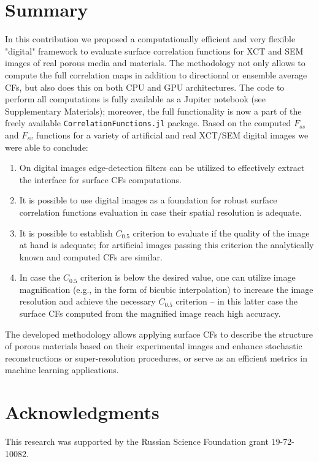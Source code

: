 \documentclass[reprint,amsmath,amssymb,aps,pre,showkeys,showpacs]{revtex4-1}
\newcommand{\code}[1]{\colorbox{light-gray}{\texttt{#1}}}
\begin{document}
\section{Summary}
\label{sec:summary}
In this contribution we proposed a computationally efficient and very flexible
"digital" framework to evaluate surface correlation functions for XCT and SEM
images of real porous media and materials. The methodology not only allows to
compute the full correlation maps in addition to directional or ensemble average
CFs, but also does this on both CPU and GPU architectures. The code to perform
all computations is fully available as a Jupiter notebook (see Supplementary
Materials); moreover, the full functionality is now a part of the freely
available \code{CorrelationFunctions.jl} package. Based on the computed $F_{ss}$
and $F_{sv}$ functions for a variety of artificial and real XCT/SEM digital
images we were able to conclude:
\begin{enumerate}
  \item On digital images edge-detection filters can be utilized to effectively
    extract the interface for surface CFs computations.
  \item It is possible to use digital images as a foundation for robust surface
    correlation functions evaluation in case their spatial resolution is
    adequate.
  \item It is possible to establish $C_{0.5}$ criterion to evaluate if the
    quality of the image at hand is adequate; for artificial images passing this
    criterion the analytically known and computed CFs are similar.
  \item In case the $C_{0.5}$ criterion is below the desired value, one can
    utilize image magnification (e.g., in the form of bicubic interpolation) to
    increase the image resolution and achieve the necessary $C_{0.5}$ criterion
    -- in this latter case the surface CFs computed from the magnified image
    reach high accuracy.
\end{enumerate}
The developed methodology allows applying surface CFs to describe the structure
of porous materials based on their experimental images and enhance stochastic
reconstructions or super-resolution procedures, or serve as an efficient metrics
in machine learning applications.

\section{Acknowledgments}
This research was supported by the Russian Science Foundation grant
19-72-10082.
\end{document}
